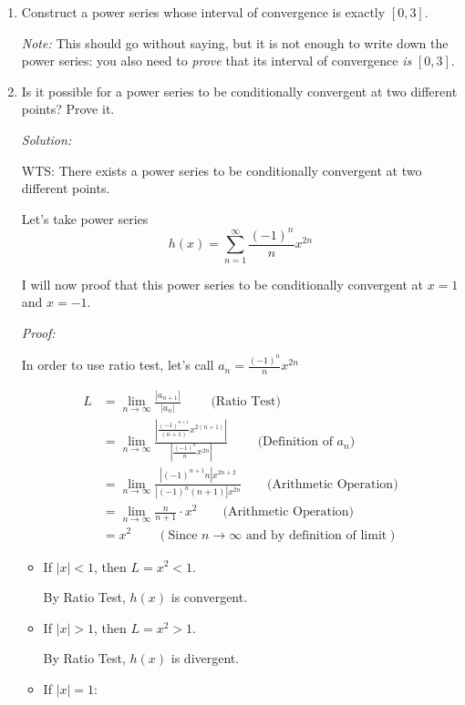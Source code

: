 \documentclass[12pt]{exam}
\newcommand {\DS} [1] {${\displaystyle #1}$}
\begin{document}
\begin{enumerate}

\item Construct a power series whose interval of convergence is exactly \DS{[0,3]}. 

\emph{Note:}  This should go without saying, but it is not enough to write down the power series: you also need to \emph{prove} that its interval of convergence \emph{is} \DS{[0,3].}

\item Is it possible for a power series to be conditionally convergent at two different points?  Prove it.

\emph{Solution:}

WTS: There exists a power series to be conditionally convergent at two different points.

Let's take power series $$h(x) = \sum_{n = 1}^{\infty} \frac{(-1)^n}{n}x^{2n}$$

I will now proof that this power series to be conditionally convergent at $x=1$ and $x=-1$.

\emph{Proof:}

In order to use ratio test, let's call $a_n =  \frac{(-1)^n}{n}x^{2n}$

\begin{align*}
	L &= \lim_{n \to \infty} \frac{|a_{n + 1}|}{|a_n|} \qquad\mbox{ (Ratio Test) } \\
	&= \lim_{n \to \infty} \frac{|\frac{(-1)^{n+1}}{(n+1)}x^{2(n+1)}|}{|\frac{(-1)^n}{n}x^{2n}|} \qquad\mbox{ (Definition of } a_n ) \\
	&= \lim_{n \to \infty} \frac{|(-1)^{n+1}n|x^{2n+2}}{|(-1)^n(n+1)|x^{2n}} \qquad\mbox{(Arithmetic Operation)} \\
	&= \lim_{n \to \infty} \frac{n}{n+1}\cdot x^2 \qquad\mbox{(Arithmetic Operation)} \\
	&= x^2 \qquad( \mbox{Since } n \to \infty \mbox{ and by definition of limit})
\end{align*}

\begin{itemize}
	\item If $|x| < 1$, then $L = x^2 < 1$.

	By Ratio Test, $h(x)$ is convergent.

	\item If $|x| > 1$, then $L = x^2 > 1$.

	By Ratio Test, $h(x)$ is divergent.

	\item If $|x| = 1$:


\end{itemize}
\end{enumerate}
\end{document}
